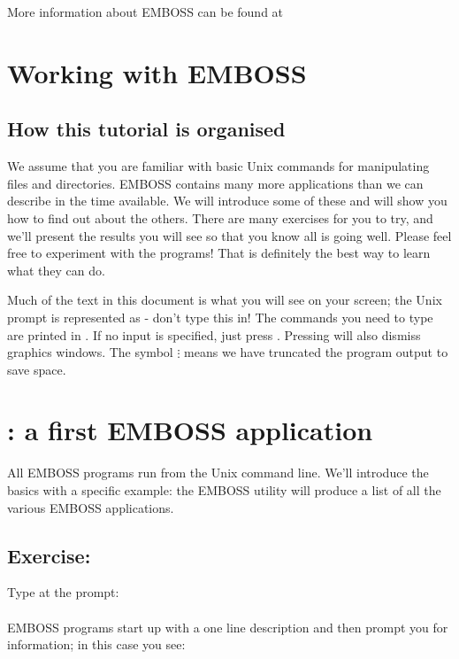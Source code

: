 \documentclass[12pt]{report}
\begin{document}
More information about EMBOSS can be found at\\

\section{Working with EMBOSS}

\subsection{How this tutorial is organised}

We assume that you are familiar with basic Unix commands for
manipulating files and directories. EMBOSS contains many more
applications than we can describe in the time available. We will
introduce some of these and will show you how to find out about the
others. There are many exercises for you to try, and we'll present the
results you will see so that you know all is going well. Please feel
free to experiment with the programs!  That is definitely the best way
to learn what they can do.

Much of the text in this document is what you will see on your screen;
the Unix prompt is represented as \unix{} - don't type this in! The
commands you need to type are printed in . If no input is
specified, just press . Pressing  will also
dismiss graphics windows. The symbol $\vdots$ means we have
truncated the program output to save space.

\section{: a first EMBOSS application}
All EMBOSS programs run from the Unix command line. We'll introduce
the basics with a specific example: the EMBOSS utility
 will produce a list of all the various EMBOSS
applications.

\subsection*{Exercise: }

Type  at the \unix{}prompt:\\

\unix{}\\
 
EMBOSS programs start up with a one line description and then prompt you for information; in this case you see:\\
\end{document}
